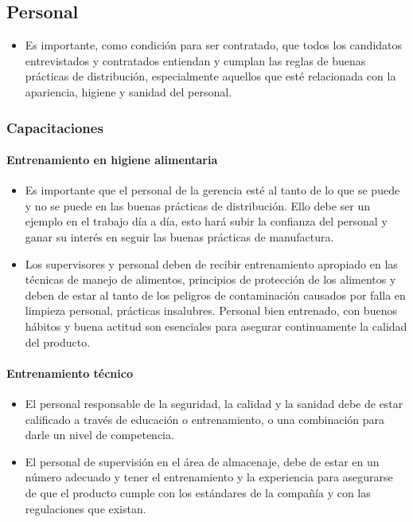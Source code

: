 \subsection{Personal}

\begin{itemize}
	\item Es importante, como condición para ser contratado, que todos los candidatos entrevistados y contratados entiendan y cumplan las reglas de buenas prácticas de distribución, especialmente aquellos que esté relacionada con la apariencia, higiene y sanidad del personal.
\end{itemize}

\subsubsection{Capacitaciones}

\paragraph{Entrenamiento en higiene alimentaria}

\begin{itemize}
	\item Es importante que el personal de la gerencia esté al tanto de lo que se puede y no se puede en las buenas prácticas de distribución. Ello debe ser un ejemplo en el trabajo día a día, esto hará subir la confianza del personal y ganar su interés en seguir las buenas prácticas de manufactura.
	\item Los supervisores y personal deben de recibir entrenamiento apropiado en las técnicas de manejo de alimentos, principios de protección de los alimentos y deben de estar al tanto de los peligros de contaminación causados por falla en limpieza personal, prácticas insalubres. Personal bien entrenado, con buenos hábitos y buena actitud son esenciales para asegurar continuamente la calidad del producto.
\end{itemize}

\paragraph{Entrenamiento técnico}

\begin{itemize}
	\item El personal responsable de la seguridad, la calidad y la sanidad debe de estar calificado a través de educación o entrenamiento, o una combinación para darle un nivel de competencia.
	\item El personal de supervisión en el área de almacenaje, debe de estar en un número adecuado y tener el entrenamiento y la experiencia para asegurarse de que el producto cumple con los estándares de la compañía y con las regulaciones que existan.
\end{itemize}

